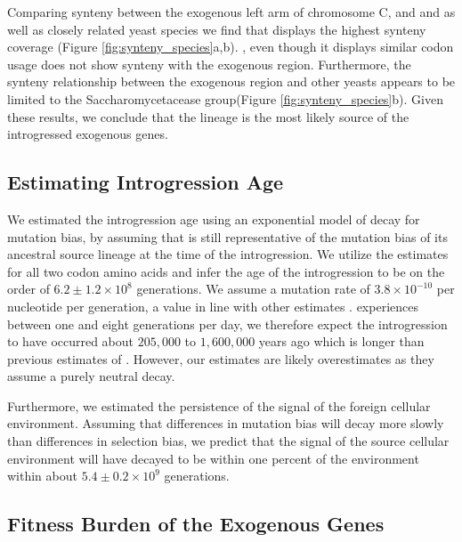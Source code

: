 \documentclass[12pt]{article}
\begin{document}
Comparing synteny between the exogenous left arm of chromosome C, and \gossypii and \dubl as well as closely related yeast species we find that \gossypii displays the highest synteny coverage  (Figure \ref{fig:synteny_species}a,b).
\dubl, even though it displays similar codon usage does not show synteny with the exogenous region.
Furthermore, the synteny relationship between the exogenous region and other yeasts appears to be limited to the Saccharomycetacease group(Figure \ref{fig:synteny_species}b).
Given these results, we conclude that the \gossypii lineage is the most likely source of the introgressed exogenous genes.

\subsection*{Estimating Introgression Age}

We estimated the introgression age using an exponential model of decay for mutation bias, by assuming that \gossypii is still representative of the mutation bias of its ancestral source lineage at the time of the introgression.
We utilize the \DM estimates for all two codon amino acids and infer the age of the introgression to be on the order of $6.2\pm1.2\times 10^8$ generations. 
We assume a mutation rate of $3.8\times 10^{-10}$ per nucleotide per generation, a value in line with other estimates \citep{zhu2014, lang2008}.
\kluyveri experiences between one and eight generations per day, we therefore expect the introgression to have occurred about $205,000$ to $1,600,000$ years ago which is  longer than previous estimates of \citet{friedrich2015}.
However, our estimates are likely overestimates as they assume a purely neutral decay.

Furthermore, we estimated the persistence of the signal of the foreign cellular environment.
Assuming that differences in mutation bias will decay more slowly than differences in selection bias, we predict that the \DM signal of the source cellular environment will have decayed to be within one percent of the \kluyveri environment within about $5.4\pm0.2\times 10^9 $ generations.


\subsection*{Fitness Burden of the Exogenous Genes}
\end{document}
